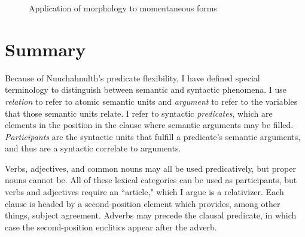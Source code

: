 \begin{figure}[H]
\begin{center}
\caption{Application of morphology to momentaneous forms}
\label{figure:momentaneousapplication}
\end{center}
\end{figure}

\section{Summary} \label{ch:clause:summary}

Because of Nuuchahnulth's predicate flexibility, I have defined special terminology to distinguish between semantic and syntactic phenomena. I use \textit{relation} to refer to atomic semantic units and \textit{argument} to refer to the variables that those semantic units relate. I refer to syntactic \textit{predicates}, which are elements in the position in the clause where semantic arguments may be filled. \textit{Participants} are the syntactic units that fulfill a predicate's semantic arguments, and thus are a syntactic correlate to arguments.

Verbs, adjectives, and common nouns may all be used predicatively, but proper nouns cannot be. All of these lexical categories can be used as participants, but verbs and adjectives require an ``article," which I argue is a relativizer. Each clause is headed by a second-position element which provides, among other things, subject agreement. Adverbs may precede the clausal predicate, in which case the second-position enclitics appear after the adverb.

